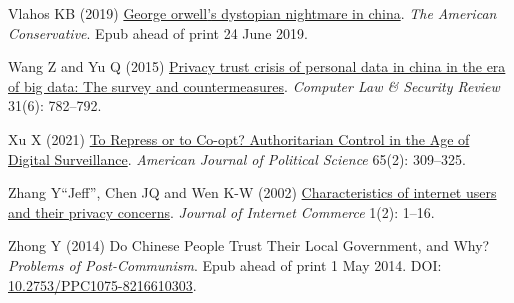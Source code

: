 \documentclass[
  letterpaper,
  DIV=11,
  numbers=noendperiod]{scrartcl}
\newlength{\cslhangindent}
\newlength{\cslentryspacingunit} %
\newenvironment{CSLReferences}[2] %
 {%
  \setlength{\parindent}{0pt}
  \ifodd #1
  \let\oldpar\par
  \def\par{\hangindent=\cslhangindent\oldpar}
  \fi
  \setlength{\parskip}{#2\cslentryspacingunit}
 }%
 {}
\begin{document}
\begin{CSLReferences}{1}{0}
\leavevmode{}%
Vlahos KB (2019)
\href{https://www.theamericanconservative.com/george-orwells-dystopian-nightmare-in-china-1984/}{George
orwell{'}s dystopian nightmare in china}. \emph{The American
Conservative}. Epub ahead of print 24 June 2019.

\leavevmode{}%
Wang Z and Yu Q (2015)
\href{https://doi.org/10.1016/j.clsr.2015.08.006}{Privacy trust crisis
of personal data in china in the era of big data: The survey and
countermeasures}. \emph{Computer Law \& Security Review} 31(6):
782--792.

\leavevmode{}%
Xu X (2021) \href{https://doi.org/10.1111/ajps.12514}{To Repress or to
Co-opt? Authoritarian Control in the Age of Digital Surveillance}.
\emph{American Journal of Political Science} 65(2): 309--325.

\leavevmode{}%
Zhang Y``Jeff'', Chen JQ and Wen K-W (2002)
\href{https://doi.org/10.1300/J179v01n02_01}{Characteristics of internet
users and their privacy concerns}. \emph{Journal of Internet Commerce}
1(2): 1--16.

\leavevmode{}%
Zhong Y (2014) Do Chinese People Trust Their Local Government, and Why?
\emph{Problems of Post-Communism}. Epub ahead of print 1 May 2014. DOI:
\href{https://doi.org/10.2753/PPC1075-8216610303}{10.2753/PPC1075-8216610303}.

\end{CSLReferences}
\end{document}
